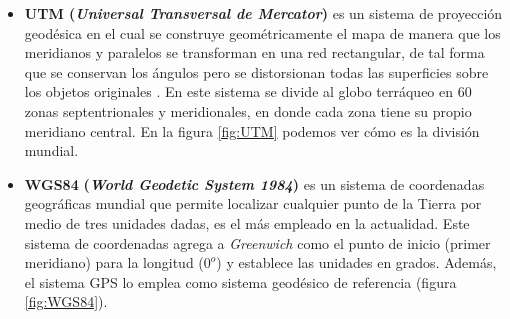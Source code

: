 \begin{itemize}
	\item \textbf{UTM (\textit{Universal Transversal de Mercator})} es un sistema de proyección geodésica en el cual se construye geométricamente el mapa de manera que los meridianos y paralelos se transforman en una red rectangular, de tal forma que se conservan los ángulos pero se distorsionan todas las superficies sobre los objetos originales \cite{utm-nuevo}. En este sistema se divide al globo terráqueo en 60 zonas septentrionales y meridionales, en donde cada zona tiene su propio meridiano central. En la figura \ref{fig:UTM} podemos ver cómo es la división mundial.
	
	\item \textbf{WGS84} \textbf{(\textit{World Geodetic System 1984})} es un sistema de coordenadas geográficas mundial que permite localizar cualquier punto de la Tierra por medio de tres unidades dadas, es el más empleado en la actualidad. Este sistema de coordenadas agrega a \textit{Greenwich} como el punto de inicio (primer meridiano) para la longitud ($0^o$) y establece las unidades en grados. Además, el sistema GPS lo emplea como sistema geodésico de referencia \cite{VictorOlaya} (figura \ref{fig:WGS84}).
	

\end{itemize}

